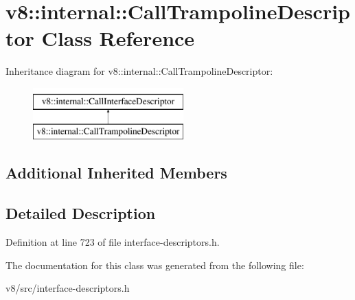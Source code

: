 \hypertarget{classv8_1_1internal_1_1CallTrampolineDescriptor}{}\section{v8\+:\+:internal\+:\+:Call\+Trampoline\+Descriptor Class Reference}
\label{classv8_1_1internal_1_1CallTrampolineDescriptor}
Inheritance diagram for v8\+:\+:internal\+:\+:Call\+Trampoline\+Descriptor\+:\begin{figure}[H]
\begin{center}
\leavevmode
\includegraphics[height=2.000000cm]{classv8_1_1internal_1_1CallTrampolineDescriptor}
\end{center}
\end{figure}
\subsection*{Additional Inherited Members}


\subsection{Detailed Description}


Definition at line 723 of file interface-\/descriptors.\+h.



The documentation for this class was generated from the following file\+:\begin{DoxyCompactItemize}
\item 
v8/src/interface-\/descriptors.\+h\end{DoxyCompactItemize}
